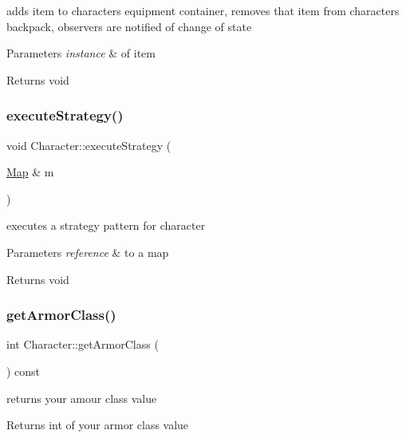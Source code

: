 adds item to characters equipment container, removes that item from characters backpack, observers are notified of change of state 
\begin{DoxyParams}{Parameters}
{\em instance} & of item \\
\hline
\end{DoxyParams}
\begin{DoxyReturn}{Returns}
void 
\end{DoxyReturn}
\hypertarget{class_character_a67e50bbbfdf69cce320c1b5079f5f052}{}\label{class_character_a67e50bbbfdf69cce320c1b5079f5f052} 
\subsubsection{\texorpdfstring{execute\+Strategy()}{executeStrategy()}}
{\footnotesize\ttfamily void Character\+::execute\+Strategy (\begin{DoxyParamCaption}\item[{\hyperlink{class_map}{Map} \&}]{m }\end{DoxyParamCaption})}

executes a strategy pattern for character 
\begin{DoxyParams}{Parameters}
{\em reference} & to a map \\
\hline
\end{DoxyParams}
\begin{DoxyReturn}{Returns}
void 
\end{DoxyReturn}
\hypertarget{class_character_a6674dec79e4677370162aeb5674084bf}{}\label{class_character_a6674dec79e4677370162aeb5674084bf} 
\subsubsection{\texorpdfstring{get\+Armor\+Class()}{getArmorClass()}}
{\footnotesize\ttfamily int Character\+::get\+Armor\+Class (\begin{DoxyParamCaption}{ }\end{DoxyParamCaption}) const}

returns your amour class value \begin{DoxyReturn}{Returns}
int of your armor class value 
\end{DoxyReturn}
\hypertarget{class_character_a2b4ae8b5bddbc8f3da69d50af8d1859a}{}\label{class_character_a2b4ae8b5bddbc8f3da69d50af8d1859a} 
